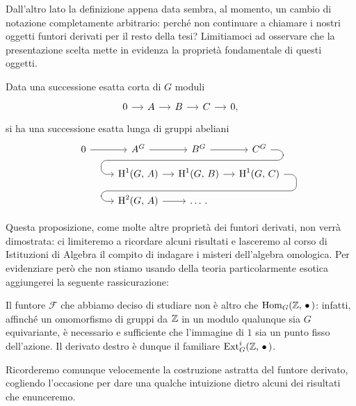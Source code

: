 Dall'altro lato la definizione appena data sembra, al momento, un cambio di notazione completamente arbitrario: perché non continuare a chiamare i nostri oggetti funtori derivati per il resto della tesi? Limitiamoci ad osservare che la presentazione scelta mette in evidenza la proprietà fondamentale di questi oggetti.

\begin{theorem}\label{fond} 
	Data una successione esatta corta di $ G $ moduli
	\[\begin{tikzcd}[column sep = small]
	0 \rar & A \rar & B \rar & C \rar & 0,
	\end{tikzcd}\]
	si ha una successione esatta lunga di gruppi abeliani
	\[\begin{tikzcd}[column sep = small, row sep = small]
	0 \rar & A^G \rar & B^G \arrow[d,phantom, ""{coordinate, name=Z}] \rar & C^G \arrow[dll, 
	rounded corners = 6 pt, 
	to path={ --([xshift=3ex]\tikztostart.east)
		|- (Z)[near end]\tikztonodes
		-| ([xshift=-3ex]\tikztotarget.west)
		-- (\tikztotarget)}] \\
	\qquad \quad &\HH^1(G, \, A) \rar & \HH^1(G, \, B) \arrow[d,phantom, ""{coordinate, name=W}] \rar & \HH^1(G, \, C) \arrow[dll, 
	rounded corners = 6 pt, 
	to path={ --([xshift=3ex]\tikztostart.east)
		|- (W)[near end]\tikztonodes
		-| ([xshift=-3ex]\tikztotarget.west)
		-- (\tikztotarget)}]  \\
	&\HH^2(G, \, A) \rar & \dots \, .
	& \end{tikzcd}\]
\end{theorem}

Questa proposizione, come molte altre proprietà dei funtori derivati, non verrà dimostrata: ci limiteremo a ricordare alcuni risultati e lasceremo al corso di Istituzioni di Algebra il compito di indagare i misteri dell'algebra omologica. Per evidenziare però che non stiamo usando della teoria particolarmente esotica aggiungerei la seguente rassicurazione:

\begin{remark}
	Il funtore $ \mathcal{F} $ che abbiamo deciso di studiare non è altro che $ \operatorname{Hom}_G(\mathbb{Z},\, \bullet\,) $: infatti, affinché un omomorfismo di gruppi da $ \mathbb{Z} $ in un modulo qualunque sia $ G $ equivariante, è necessario e sufficiente che l'immagine di $ 1 $ sia un punto fisso dell'azione. Il derivato destro è dunque il familiare $ \operatorname{Ext}^i_G(\mathbb{Z}, \, \bullet\,) $.
\end{remark}

Ricorderemo comunque velocemente la costruzione astratta del funtore derivato, cogliendo l'occasione per dare una qualche intuizione dietro alcuni dei risultati che enunceremo. 


